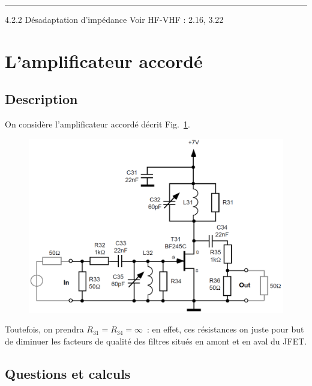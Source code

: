 \documentclass{article}
\begin{document}


\vspace{5pt}\hrule\vspace{2pt}


\vspace{20pt}



4.2.2
Désadaptation d'impédance
Voir HF-VHF : 2.16, 3.22





\section{L'amplificateur accordé}

\subsection{Description}

On considère l'amplificateur accordé décrit Fig.~\ref{schem6}.

\begin{figure}[h!]
	\centering
	\includegraphics[width=.7\textwidth]{schem6}
	\caption{}
	\label{schem6}
\end{figure}

Toutefois, on prendra $R_{31}=R_{34}=\infty$~: en effet, ces résistances on juste pour but de diminuer les facteurs de qualité des filtres situés en amont et en aval du JFET.

\subsection{Questions et calculs}
\end{document}
